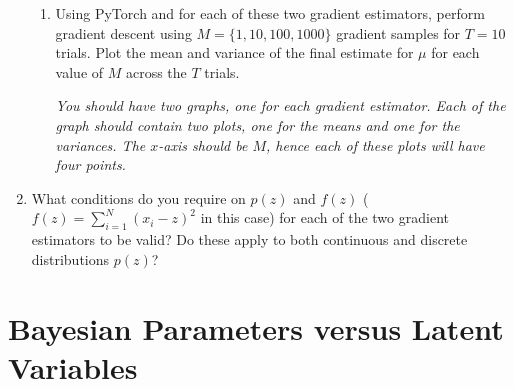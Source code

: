 \documentclass[11pt]{article}
\begin{document}
\begin{enumerate}[label=(\Alph*)]
\begin{enumerate}[label=(\roman*)]
        \item Using PyTorch and for each of these two gradient estimators, perform gradient descent using $M=\{1,10,100,1000\}$ gradient samples for $T=10$ trials. Plot the mean and variance of the final estimate for $\mu$ for each value of $M$ across the $T$ trials.
        
        \textit{You should have two graphs, one for each gradient estimator. Each of the graph should contain two plots, one for the means and one for the variances. The $x$-axis should be $M$, hence each of these plots will have four points.}
        
    \end{enumerate}
    
    \item  What conditions do you require on $p(z)$ and $f(z)$ ($f(z)=\sum^N_{i=1} (x_i - z)^2$ in this case) for each of the two gradient estimators to be valid? Do these apply to both continuous and discrete distributions $p(z)$? 

\end{enumerate} 

\newpage 

\section{Bayesian Parameters versus Latent Variables}
\end{document}
